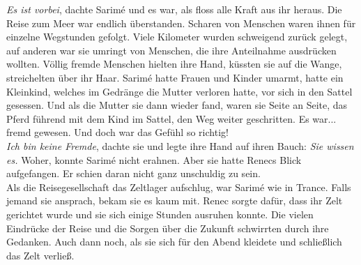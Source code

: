 \textit{Es ist vorbei}, dachte Sarimé und es war, als floss alle Kraft aus ihr heraus. Die Reise 
zum Meer war endlich überstanden. Scharen von Menschen waren ihnen für einzelne Wegstunden gefolgt. 
Viele Kilometer wurden schweigend zurück gelegt, auf anderen war sie umringt von Menschen, die ihre 
Anteilnahme ausdrücken wollten. Völlig fremde Menschen hielten ihre Hand, küssten sie auf die Wange, 
streichelten über ihr Haar. Sarimé hatte Frauen und Kinder umarmt, hatte ein Kleinkind, welches im 
Gedränge die Mutter verloren hatte, vor sich in den Sattel gesessen. Und als die Mutter sie dann 
wieder fand, waren sie Seite an Seite, das Pferd führend mit dem Kind im Sattel, den Weg weiter 
geschritten. Es war... fremd gewesen. Und doch war das Gefühl so richtig!\\
\textit{Ich bin keine Fremde}, dachte sie und legte ihre Hand auf ihren Bauch: \textit{Sie wissen 
es.} Woher, konnte Sarimé nicht erahnen. Aber sie hatte Renecs Blick aufgefangen. Er schien daran 
nicht ganz unschuldig zu sein. \\
Als die Reisegesellschaft das Zeltlager aufschlug, war Sarimé wie in Trance. Falls jemand sie 
ansprach, bekam sie es kaum mit. Renec sorgte dafür, dass ihr Zelt gerichtet wurde und sie sich 
einige Stunden ausruhen konnte. Die vielen Eindrücke der Reise und die Sorgen über die Zukunft 
schwirrten durch ihre Gedanken. Auch dann noch, als sie sich für den Abend kleidete und schließlich 
das Zelt verließ.\\

